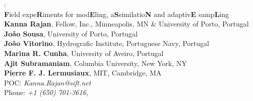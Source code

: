 \begin{titlepage}


\begin{center}
\Large
\proje:\\\textbf{F}ield expe\textbf{R}iments for mod\textbf{E}ling, a\textbf{S}similatio\textbf{N} and adaptiv\textbf{E} samp\textbf{L}ing\\

\vspace{+5in}
\large
\textbf{Kanna Rajan}, Fellow, \org Inc., Minneapolis, MN \& University of Porto, Portugal\\
\textbf{Jo\~ao Sousa}, University of Porto, Portugal\\
\textbf{Jo\~ao Vitorino}, Hydrografic Institute, Portuguese Navy, Portugal\\
\textbf{Marina R. Cunha}, University of Aveiro, Portugal\\
\textbf{Ajit Subramaniam}, Columbia University, New York, NY\\
\textbf{Pierre F. J. Lermusiaux}, MIT, Cambridge, MA\\
POC: \emph{Kanna.Rajan@sift.net}\\
Phone: \emph{+1 (650) 701-3616}, \\
\vspace{+0.65in}

\end{center}


\end{titlepage}
